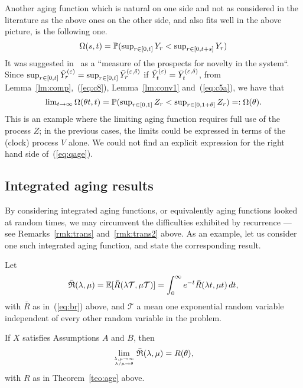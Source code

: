 \begin{rmk}
\label{rmk:age4}
Another aging function which is natural on one side and not as considered in the literature as the above ones on the other side, and also 
fits well in the above picture, is the following one.
\begin{equation}
\label{eq:q}
\textstyle \Omega(s,t)=\P(\sup_{r\in[0,t]}Y_r<\sup_{r\in[0,t+s]}Y_{r})
\end{equation}
It was suggested in~\cite{kn:FIN} as a ``measure of the prospects for novelty in the system``. 
Since $\sup_{r\in[0,t]}\hat Y^{(\varepsilon)}_r=\sup_{r\in[0,t]}\bar Y^{(\varepsilon,\delta)}_r$ if $\hat Y^{(\varepsilon)}_t=\bar Y^{(\varepsilon,\delta)}_t$, from Lemma~\ref{lm:comp},~(\ref{eq:c8}), Lemma~\ref{lm:conv1}
and~(\ref{eq:c5a}),
we have that
\begin{equation}
\label{eq:qage}
\textstyle \lim_{t\to\infty}\Omega(\theta t,t)=\P(\sup_{r\in[0,1]}Z_r<\sup_{r\in[0,1+\theta]}Z_{r})=:\Omega(\theta).
\end{equation}
This is an example where the limiting aging function requires full use of the process $Z$; in the previous cases, 
the limits could be expressed in terms of the (clock) process $V$ alone. 
We could not find an explicit expression for the right hand side of~(\ref{eq:qage}).
\end{rmk}


\subsection{Integrated aging results}
\label{ssec:iage}



By considering integrated aging functions, or equivalently aging functions looked at random times, we may circumvent
the difficulties exhibited by recurrence --- see Remarks~\ref{rmk:trans} and~\ref{rmk:trans2}
above. As an example, let us consider one such integrated aging function, and state the corresponding result.

Let
\begin{equation}
\label{eq:ir}
\bar{\mathfrak R}(\lambda,\mu)=\esp[\bar R(\lambda{\mathcal T},\mu {\mathcal T})]=\int_0^{\infty}e^{-t}\bar R(\lambda t,\mu t)\,dt,
\end{equation}
with $\bar R$ as in~(\ref{eq:br}) above, and ${\mathcal T}$ a mean one exponential random variable independent of every other
random variable in the problem.


\begin{theo}
\label{teo:iage}
If $X$ satisfies Assumptions  $A$ and $B$, then 
\begin{equation}
\label{eq:iage}
\lim_{\lambda,\mu\to\infty\atop{\lambda/\mu\to\theta}}\bar{\mathfrak R}(\lambda,\mu)=R(\theta),
\end{equation}
with $R$ as in Theorem~\ref{teo:age} above.
\end{theo}


